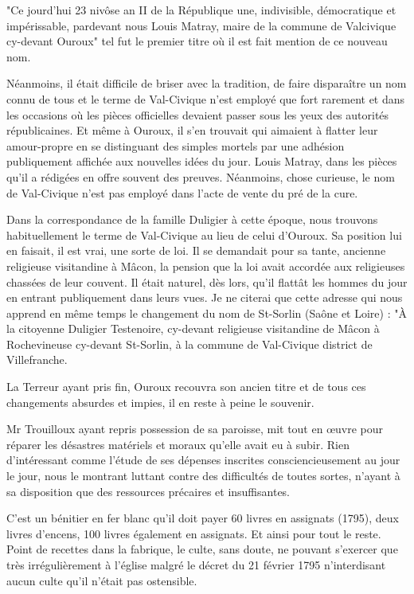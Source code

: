 "Ce jourd'hui 23 nivôse an II de la République une, indivisible, démocratique et impérissable, pardevant nous Louis Matray, maire de la commune de Valcivique cy-devant Ouroux" tel fut le premier titre où il est fait mention de ce nouveau nom.

Néanmoins, il était difficile de briser avec la tradition, de faire disparaître un nom connu de tous et le terme de Val-Civique n'est employé que fort rarement et dans les occasions où les pièces officielles devaient passer sous les yeux des autorités républicaines. Et même à Ouroux, il s'en trouvait qui aimaient à flatter leur amour-propre en se distinguant des simples mortels par une adhésion publiquement affichée aux nouvelles idées du jour. Louis Matray, dans les pièces qu'il a rédigées en offre souvent des preuves. Néanmoins, chose curieuse, le nom de Val-Civique n'est pas employé dans l'acte de vente du pré de la cure.

Dans la correspondance de la famille Duligier à cette époque, nous trouvons habituellement le terme de Val-Civique au lieu de celui d'Ouroux. Sa position lui en faisait, il est vrai, une sorte de loi. Il se demandait pour sa tante, ancienne religieuse visitandine à Mâcon, la pension que la loi avait accordée aux religieuses chassées de leur couvent. Il était naturel, dès lors, qu'il flattât les hommes du jour en entrant publiquement dans leurs vues. Je ne citerai que cette adresse qui nous apprend en même temps le changement du nom de St-Sorlin (Saône et Loire) : "À la citoyenne Duligier Testenoire, cy-devant religieuse visitandine de Mâcon à Rochevineuse cy-devant St-Sorlin, à la commune de Val-Civique district de Villefranche.

La Terreur ayant pris fin, Ouroux recouvra son ancien titre et de tous ces changements absurdes et impies, il en reste à peine le souvenir.

Mr Trouilloux ayant repris possession de sa paroisse, mit tout en œuvre pour réparer les désastres matériels et moraux qu'elle avait eu à subir. Rien d'intéressant comme l'étude de ses dépenses inscrites consciencieusement au jour le jour, nous le montrant luttant contre des difficultés de toutes sortes, n'ayant à sa disposition que des ressources précaires et insuffisantes.

C'est un bénitier en fer blanc qu'il doit payer 60 livres en assignats (1795), deux livres d'encens, 100 livres également en assignats. Et ainsi pour tout le reste. Point de recettes dans la fabrique, le culte, sans doute, ne pouvant s'exercer que très irrégulièrement à l'église malgré le décret du 21 février 1795 n'interdisant aucun culte qu'il n'était pas ostensible.

